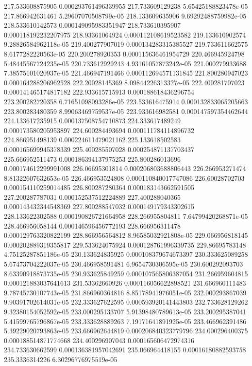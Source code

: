 {217.533608875905 0.000293761496339955
217.733609129238 5.65425188823478e-05
217.866942631461 5.29607070508799e-05
218.133609635906 9.69292488759982e-05
218.533610142573 0.000149095983351947
218.733610395907 0.000118192232207975
218.93361064924 0.000112108619523582
219.133610902574 9.28826584962118e-05
219.400277907019 0.000134283315385527
219.733611662575 8.6177282220563e-05
220.200278920353 0.000115636461954729
220.466945924798 5.48445567724235e-05
220.733612929243 4.93161057873242e-05
221.000279933688 7.38575101020937e-05
221.466947191466 0.000112694571131845
221.800280947023 0.000164288206962528
222.20028145369 8.09844226313327e-05
222.400281707023 0.000141465174817182
222.933615715913 0.000188618436296754
223.200282720358 6.71651098093286e-05
223.533616475914 0.000132833065205663
223.800283480359 8.99063469759537e-05
223.933616982581 0.000147597354462644
224.133617235915 0.000137508754710873
224.333617489249 0.000173580205953897
224.600284493694 0.000111784114896732
224.866951498139 0.000224611479021162
225.133618502583 0.000165699945378339
225.400285507028 0.000254871137703437
225.666952511473 0.000186394137975253
225.800286013696 0.000174612299991008
226.06695301814 0.000206803688806443
226.266953271474 8.81322607632653e-05
226.466953524808 0.000110840017747086
226.60028702703 0.000154110259014485
226.800287280364 0.000183143662591505
227.200287787031 0.000152537512224889
227.400288040365 0.000143432344548369
227.800288547032 0.000149179343302615
228.133622302588 0.000190826721664958
228.266955804811 7.64799420268871e-05
228.466956058144 0.000146596456772193
228.666956311478 0.000129763320822199
228.866956564812 8.96585032921808e-05
229.066956818145 0.000202889319355817
229.533624075924 0.000128761996339735
229.86695783148 4.75125287851186e-05
230.133624835925 0.000108379674673397
230.333625089258 5.67473704222037e-05
230.466958591481 6.9654730306595e-05
230.600292093703 8.63390918873735e-05
230.933625849259 0.000107565806387054
231.266959604815 0.000121883037641613
231.53362660926 0.000116056622898521
231.666960111483 9.78745730107743e-05
231.866960364816 8.85178941976051e-05
232.000293867039 9.90391702614031e-05
232.333627622595 0.000593920141443803
232.733628129262 9.32380154052592e-05
233.000295133707 5.91398480789613e-05
233.200295387041 5.41599765796867e-05
233.333628889263 7.19171641891925e-05
233.466962391486 5.39229020793863e-05
233.666962644819 0.000206840323779796
234.000296400375 0.000188514871774668
234.400296907043 0.000165606472974316
234.733630662599 0.000136381957042691
235.066964418155 0.00016180882593758
235.3336314226 6.30296776975519e-05
}

